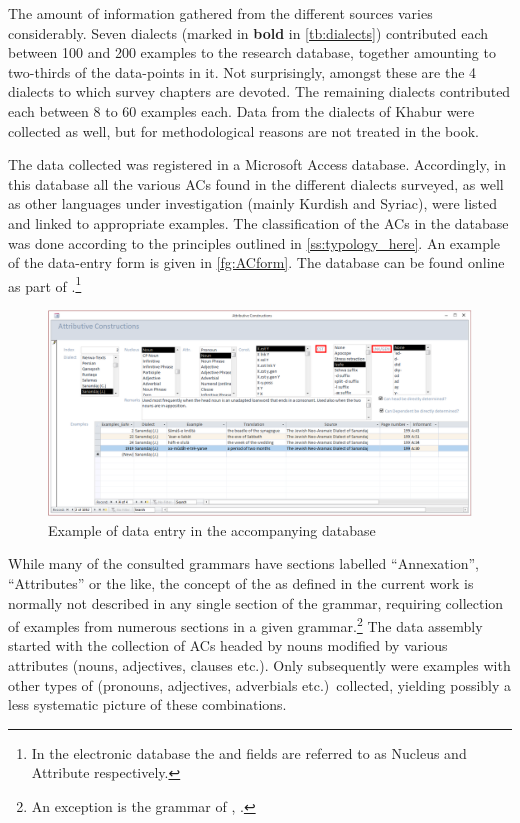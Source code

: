 The amount of information gathered from the different sources varies considerably. Seven dialects (marked in \textbf{bold} in \ref{tb:dialects}) contributed each between 100 and 200 examples to the research database, together amounting  to two-thirds of the  data-points in it. Not surprisingly, amongst these are the 4 dialects to which survey chapters are devoted. The remaining dialects contributed each between 8 to 60 examples each.  Data from the dialects of Khabur \citep{TalayKhabur} were collected as well, but for methodological reasons are not treated in the book.


The data collected was registered in a Microsoft Access database. Accordingly, in this database all the various ACs found in the different  dialects surveyed, as well as other  languages under investigation (mainly Kurdish and Syriac), were listed and linked to appropriate examples. The classification of the ACs in the database was done according to the principles outlined in \vref{ss:typology_here}. An example of the data-entry form is given in \vref{fg:ACform}. The database can be found online as part of \citet{GutmanThesis}.\footnote{In the electronic database the \prim and \secn fields are referred to as Nucleus and Attribute respectively.}

\begin{figure}


\includegraphics[width=\textheight]{figures/ACform.png}
\caption{Example of data entry in the accompanying database} \label{fg:ACform}
\end{figure}

 
While many of the consulted  grammars have sections labelled \enquote{Annexation}, \enquote{Attributes} or the like, the concept of the  as  defined in the current work is normally not described in any single section of the grammar, requiring collection of examples from numerous sections in a given grammar.\footnote{An exception is the grammar of \JZax, \citet{CohenZakho}.} The data assembly started with the collection of ACs headed by nouns modified by various attributes (nouns, adjectives, clauses etc.). Only subsequently were examples with other types of \prims (pronouns, adjectives, adverbials etc.)\ collected, yielding possibly a less systematic picture of these combinations. 

